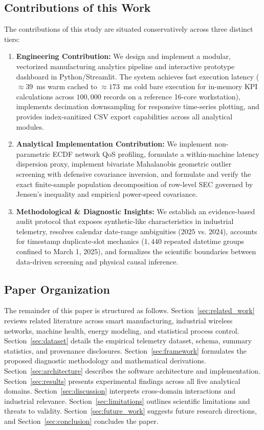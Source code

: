 \documentclass[journal]{IEEEtran}
\begin{document}
\subsection{Contributions of this Work}
The contributions of this study are situated conservatively across three distinct tiers:
\begin{enumerate}
    \item \textbf{Engineering Contribution:} We design and implement a modular, vectorized manufacturing analytics pipeline and interactive prototype dashboard in Python/Streamlit. The system achieves fast execution latency ($\approx 39$~ms warm cached to $\approx 173$~ms cold bare execution for in-memory KPI calculations across $100{,}000$ records on a reference 16-core workstation), implements decimation downsampling for responsive time-series plotting, and provides index-sanitized CSV export capabilities across all analytical modules.
    \item \textbf{Analytical Implementation Contribution:} We implement non-parametric ECDF network QoS profiling, formulate a within-machine latency dispersion proxy, implement bivariate Mahalanobis geometric outlier screening with defensive covariance inversion, and formulate and verify the exact finite-sample population decomposition of row-level SEC governed by Jensen's inequality and empirical power-speed covariance.
    \item \textbf{Methodological \& Diagnostic Insights:} We establish an evidence-based audit protocol that exposes synthetic-like characteristics in industrial telemetry, resolves calendar date-range ambiguities ($2025$ vs. $2024$), accounts for timestamp duplicate-slot mechanics ($1{,}440$ repeated datetime groups confined to March 1, 2025), and formalizes the scientific boundaries between data-driven screening and physical causal inference.
\end{enumerate}

\subsection{Paper Organization}
The remainder of this paper is structured as follows. Section~\ref{sec:related_work} reviews related literature across smart manufacturing, industrial wireless networks, machine health, energy modeling, and statistical process control. Section~\ref{sec:dataset} details the empirical telemetry dataset, schema, summary statistics, and provenance disclosures. Section~\ref{sec:framework} formulates the proposed diagnostic methodology and mathematical derivations. Section~\ref{sec:architecture} describes the software architecture and implementation. Section~\ref{sec:results} presents experimental findings across all five analytical domains. Section~\ref{sec:discussion} interprets cross-domain interactions and industrial relevance. Section~\ref{sec:limitations} outlines scientific limitations and threats to validity. Section~\ref{sec:future_work} suggests future research directions, and Section~\ref{sec:conclusion} concludes the paper.
\end{document}
